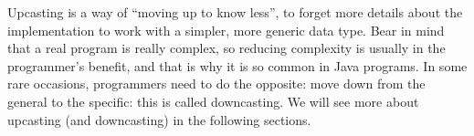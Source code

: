 Upcasting is a way of ``moving up to know less'', to forget more
details about the implementation to work with a simpler, more generic
data type. Bear in mind that a real program is really complex, so
reducing complexity is usually in the programmer's benefit, and that
is why it is so common in Java programs. In some rare occasions,
programmers need to do the opposite: move down from the general to the
specific: this is called downcasting. 
We will see more about upcasting (and downcasting) in the following
sections. 



